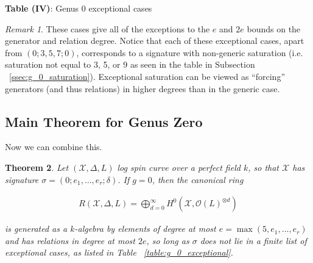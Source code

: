 \documentclass{amsart}
\theoremstyle{plain}
\newtheorem{thm}{Theorem}[section]
\theoremstyle{definition}
\theoremstyle{remark}
\newtheorem{rem}[thm]{Remark}
\numberwithin{equation}{section}
\newcommand\ssec{\subsection}
\newcommand \sx{\mathscr X}
\newcommand\sco{{\mathscr O}}
\newcommand \halfcan{L}
\begin{document}
\begin{center}
\label{table:g_0_exceptional}
\textbf{Table (IV)}: Genus 0 exceptional cases
\end{center}

\begin{rem}
These cases give all of the exceptions to the $e$ and $2e$ bounds on
the generator and relation degree. Notice that each of these
exceptional cases, apart from $(0; 3, 5, 7; 0)$, corresponds to a
signature with non-generic saturation (i.e. saturation not equal to
3, 5, or 9 as seen in the table in Subsection
~\ref{ssec:g_0_saturation}). Exceptional saturation can be viewed as
``forcing'' generators (and thus relations) in higher degrees than
in the generic case.
\end{rem}

\ssec{Main Theorem for Genus Zero}
\label{ssec:g_0_main}
Now we can combine this.

\begin{thm}
\label{thm:g_0_generators_relations}
Let $(\sx, \Delta, \halfcan)$ log spin curve over a perfect field $k$,
so that $\sx$ has signature $\sigma = (0; e_1, \ldots, e_r; \delta)$.
If $g = 0$, then the canonical ring

\begin{align*}
	R(\sx, \Delta, \halfcan) = \bigoplus_{d = 0}^\infty H^0(\sx, \sco(L)^{\otimes d})
\end{align*}

\noindent
is generated as a $k$-algebra by elements of degree at most $e =
\max(5, e_1, \ldots, e_r)$ and has relations in degree at most $2e$,
so long as $\sigma$ does not lie in a finite list of exceptional
cases, as listed in Table ~\ref{table:g_0_exceptional}.
\end{thm}
\end{document}
